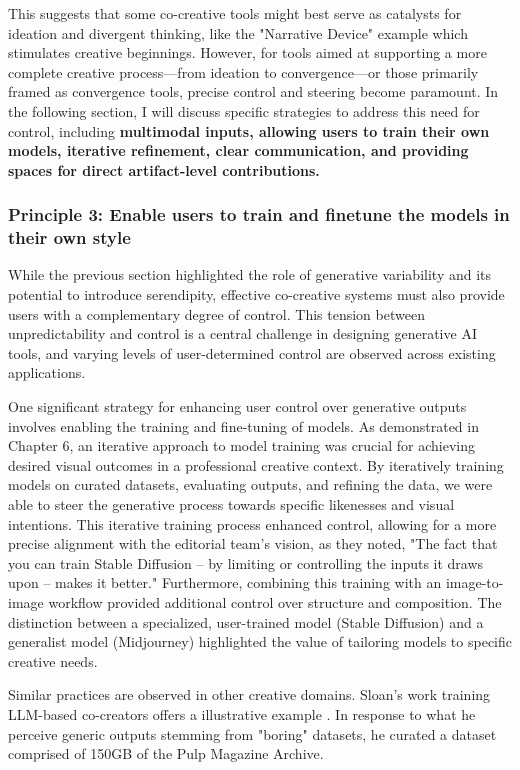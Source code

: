 This suggests that some co-creative tools might best serve as catalysts for ideation and divergent thinking, like the "Narrative Device" example which stimulates creative beginnings. However, for tools aimed at supporting a more complete creative process—from ideation to convergence—or those primarily framed as convergence tools, precise control and steering become paramount. In the following section, I will discuss specific strategies to address this need for control, including \textbf{multimodal inputs, allowing users to train their own models, iterative refinement, clear communication, and providing spaces for direct artifact-level contributions.}

\subsubsection{Principle 3: Enable users to train and finetune the models in their own style}

While the previous section highlighted the role of generative variability and its potential to introduce serendipity, effective co-creative systems must also provide users with a complementary degree of control. This tension between unpredictability and control is a central challenge in designing generative AI tools, and varying levels of user-determined control are observed across existing applications.

One significant strategy for enhancing user control over generative outputs involves enabling the training and fine-tuning of models. As demonstrated in Chapter 6, an iterative approach to model training was crucial for achieving desired visual outcomes in a professional creative context. By iteratively training models on curated datasets, evaluating outputs, and refining the data, we were able to steer the generative process towards specific likenesses and visual intentions. This iterative training process enhanced control, allowing for a more precise alignment with the editorial team's vision, as they noted, "The fact that you can train Stable Diffusion – by limiting or controlling the inputs it draws upon – makes it better." Furthermore, combining this training with an image-to-image workflow provided additional control over structure and composition. The distinction between a specialized, user-trained model (Stable Diffusion) and a generalist model (Midjourney) highlighted the value of tailoring models to specific creative needs.

Similar practices are observed in other creative domains. Sloan's work training LLM-based co-creators offers a illustrative example \cite{Sloan2016-fj}. In response to what he perceive generic outputs stemming from "boring" datasets, he curated a dataset comprised of 150GB of the Pulp Magazine Archive.

